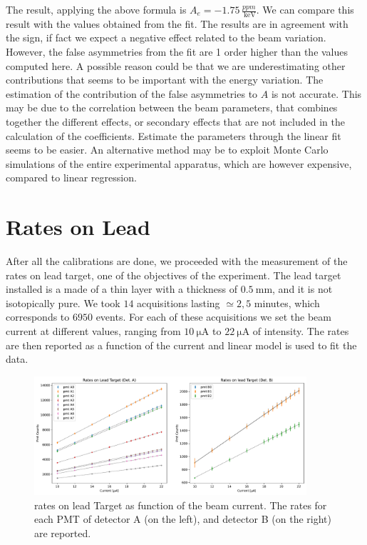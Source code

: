 The result, applying the above formula is $A_{e} = -1.75 \, \frac{ppm}{\SI{}{\kilo \electronvolt}}$. We can compare this result with the values obtained from the fit. The results are in agreement with the sign, if fact we expect a negative effect related to the beam variation. However, the false asymmetries from the fit are 1 order higher than the values computed here. A possible reason could be that we are underestimating other contributions that seems to be important with the energy variation. The estimation of the contribution of the false asymmetries to $A$ is not accurate. This may be due to the correlation between the beam parameters, that combines together the different effects, or secondary effects that are not included in the calculation of the coefficients. 
Estimate the parameters through the linear fit seems to be easier. An alternative method may be to exploit Monte Carlo simulations of the entire experimental apparatus, which are however expensive, compared to linear regression.

\section{Rates on Lead}

After all the calibrations are done, we proceeded with the measurement of the rates on lead target, one of the objectives of the experiment.
The lead target installed is a made of a thin layer with a thickness of $\SI{0.5}{\milli \meter}$, and it is not isotopically pure.
We took $14$ acquisitions lasting $\simeq 2,5$ minutes, which corresponds to $6950$ events. For each of these acquisitions we set the beam current at different values, ranging from $\SI{10}{\micro \ampere}$ to $\SI{22}{\micro \ampere}$ of intensity. The rates are then reported as a function of the current and linear model is used to fit the data.

\begin{figure}[hbtp]
\centering
\includegraphics[width = 0.9\textwidth]{Analysis/LeadRates/LeadRates.pdf}
\caption{rates on lead Target as function of the beam current. The rates for each PMT of detector A (on the left), and detector B (on the right) are reported.}
\end{figure}

